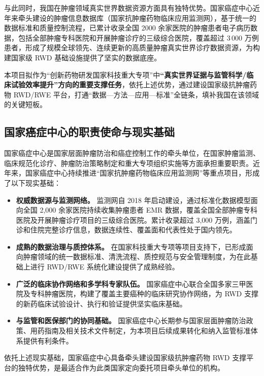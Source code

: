 \documentclass[12pt, a4paper, fontset=mac]{ctexart} %
\begin{document}
与此同时，我国在肿瘤领域真实世界数据资源方面具有独特优势。国家癌症中心近年来牵头建设的肿瘤信息数据库（国家抗肿瘤药物临床应用监测网），基于统一的数据标准和质量控制流程，已累计收录全国 2000 余家医院的肿瘤患者电子病历数据，包括全部肿瘤专科医院和开展肿瘤诊疗的三级综合医院，覆盖超过 3\,000 万例患者，形成了规模全球领先、连续更新的高质量肿瘤真实世界诊疗数据资源\cite{ncc_internal_db,ma_tumor_bigdata_2022}，为构建国家级 RWD 基础设施提供了坚实的数据底座。

本项目拟作为“创新药物研发国家科技重大专项”中\textbf{“真实世界证据与监管科学/临床试验效率提升”方向的重要支撑任务}，依托上述优势，通过建设国家级抗肿瘤药物 RWD/RWE 平台，打通“数据—方法—应用—标准”全链条，填补我国在该领域的关键短板。

\subsection{国家癌症中心的职责使命与现实基础}

国家癌症中心是国家层面肿瘤防治和癌症控制工作的牵头单位，在国家肿瘤监测、临床规范化诊疗、肿瘤防治策略制定和重大专项组织实施等方面承担重要职责\cite{ncc_internal_db,monitoring_network_whitepaper}。近年来，国家癌症中心持续推进“国家抗肿瘤药物临床应用监测网”等重点项目，形成了以下现实基础：

\begin{itemize}
\item \textbf{权威数据源与监测网络。} 监测网自 2018 年启动建设，通过标准化数据模型面向全国 2,000 余家医院持续收集肿瘤患者 EMR 数据，覆盖全国全部肿瘤专科医院及开展肿瘤诊疗项目的三级综合医院。累计收录超过 3,000 万例，涵盖门诊和住院完整诊疗信息，数据连续性、覆盖面和代表性处于国内领先。
  \item \textbf{成熟的数据治理与质控体系。} 在国家科技重大专项等项目支持下，已形成面向肿瘤领域的统一数据标准、清洗流程、质控规范与安全管理制度，为在此基础上进行 RWD/RWE 系统化建设提供了成熟经验。
  \item \textbf{广泛的临床协作网络和多学科专家队伍。} 国家癌症中心联合全国多家三甲医院及专科肿瘤医院，构建了覆盖主要癌种的临床研究协作网络，为 RWD 支撑的新药临床试验设计、执行和验证提供坚实临床基础。
  \item \textbf{与监管和医保部门的协同基础。} 国家癌症中心长期参与国家层面肿瘤防治政策、用药指南及相关技术文件制定，为本项目后续成果转化和纳入监管标准体系提供有利条件。
\end{itemize}

依托上述现实基础，国家癌症中心具备牵头建设国家级抗肿瘤药物 RWD 支撑平台的独特优势，是最适合作为此类国家定向委托项目牵头单位的机构。
\end{document}
